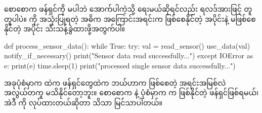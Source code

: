 စောစောက ဖန်ရှင်ကို  မပါဘဲ အောက်ပါကဲ့သို့ ရေးမယ်ဆိုရင်လည်း ရလဒ်အားဖြင့် တူတူပါပဲ။  ကို အသုံးပြုရတဲ့ အဓိက အကြောင်းအရင်းက  ဖြစ်စေနိုင်တဲ့ အပိုင်းနဲ့ မဖြစ်စေနိုင်တဲ့ အပိုင်း သီးသန့်ခွဲထားဖို့အတွက်ပါ။ 
%
%
\begin{py}
def process_sensor_data():
    while True:
        try:
            val = read_sensor()
            use_data(val)
            notify_if_necessary()
            print("Sensor data read successfully...")
        except IOError as e:
            print(e)
        time.sleep(1)
        print("processed single sensor data successfully...")
\end{py}
%
အခုပုံစံမှာက  ထဲက ဖန်ရှင်တွေထဲက ဘယ်ဟာက  ဖြစ်စေတဲ့ အရင်းအမြစ်လဲ အလွယ်\allowbreak တကူ မသိနိုင်တော့ဘူး။ စောစောက  နဲ့ ပုံစံမှာက  က  ဖြစ်နိုင်တဲ့ ဖန်ရှင်ဖြစ်ရမယ်၊ အဲဒီ  ကို  လုပ်ထားတယ်ဆိုတာ သိသာ မြင်သာပါတယ်။%


